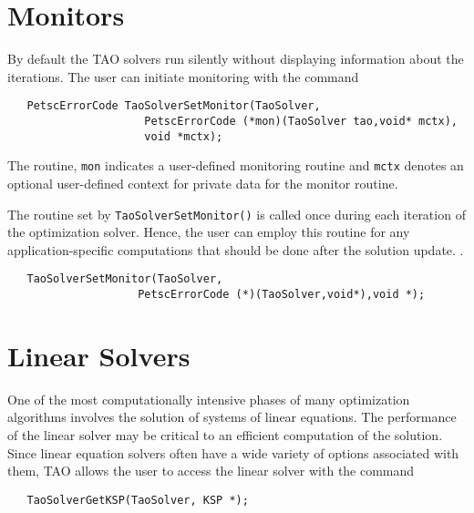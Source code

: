 \section{Monitors}

By default the TAO solvers run silently without displaying information
about the iterations. The user can initiate monitoring with the
command  
\begin{verbatim}
   PetscErrorCode TaoSolverSetMonitor(TaoSolver,
                     PetscErrorCode (*mon)(TaoSolver tao,void* mctx),
                     void *mctx);
\end{verbatim}
\noindent

The routine, {\tt mon} indicates a user-defined monitoring routine
and {\tt mctx} denotes an optional user-defined context for private 
data for the monitor routine.

The routine set by {\tt TaoSolverSetMonitor()} is called once during each
iteration of the optimization solver.  Hence, the
user can employ this routine for any application-specific computations
that should be done after the solution update. 
.
\begin{verbatim}
   TaoSolverSetMonitor(TaoSolver,
                    PetscErrorCode (*)(TaoSolver,void*),void *);
\end{verbatim}



\section{Linear Solvers}\label{sec:TaoLinearSolvers}
One of the most computationally intensive phases of many optimization
algorithms involves the solution of systems of linear equations.  
The performance
of the linear solver may be critical to an efficient computation
of the solution.
Since linear equation solvers often have a wide variety of options 
associated with them, TAO allows the user to access the linear
solver with the command

\begin{verbatim}
   TaoSolverGetKSP(TaoSolver, KSP *);
\end{verbatim}

